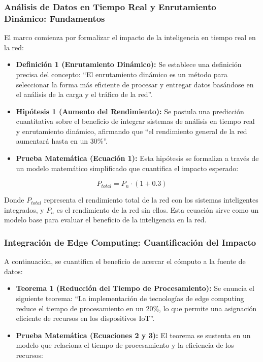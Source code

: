 \documentclass[12pt,a4paper]{article}
\begin{document}
\subsubsection{Análisis de Datos en Tiempo Real y Enrutamiento Dinámico: Fundamentos}

El marco comienza por formalizar el impacto de la inteligencia en tiempo real en la red:

\begin{itemize}
    \item \textbf{Definición 1 (Enrutamiento Dinámico):} Se establece una definición precisa del concepto: ``El enrutamiento dinámico es un método para seleccionar la forma más eficiente de procesar y entregar datos basándose en el análisis de la carga y el tráfico de la red''.
    
    \item \textbf{Hipótesis 1 (Aumento del Rendimiento):} Se postula una predicción cuantitativa sobre el beneficio de integrar sistemas de análisis en tiempo real y enrutamiento dinámico, afirmando que ``el rendimiento general de la red aumentará hasta en un 30\%''.
    
    \item \textbf{Prueba Matemática (Ecuación 1):} Esta hipótesis se formaliza a través de un modelo matemático simplificado que cuantifica el impacto esperado:
\end{itemize}

\begin{equation}
P_{total} = P_n \cdot (1 + 0.3)
\end{equation}

Donde $P_{total}$ representa el rendimiento total de la red con los sistemas inteligentes integrados, y $P_n$ es el rendimiento de la red sin ellos. Esta ecuación sirve como un modelo base para evaluar el beneficio de la inteligencia en la red.

\subsubsection{Integración de Edge Computing: Cuantificación del Impacto}

A continuación, se cuantifica el beneficio de acercar el cómputo a la fuente de datos:

\begin{itemize}
    \item \textbf{Teorema 1 (Reducción del Tiempo de Procesamiento):} Se enuncia el siguiente teorema: ``La implementación de tecnologías de edge computing reduce el tiempo de procesamiento en un 20\%, lo que permite una asignación eficiente de recursos en los dispositivos IoT''.
    
    \item \textbf{Prueba Matemática (Ecuaciones 2 y 3):} El teorema se sustenta en un modelo que relaciona el tiempo de procesamiento y la eficiencia de los recursos:
\end{itemize}
\end{document}
